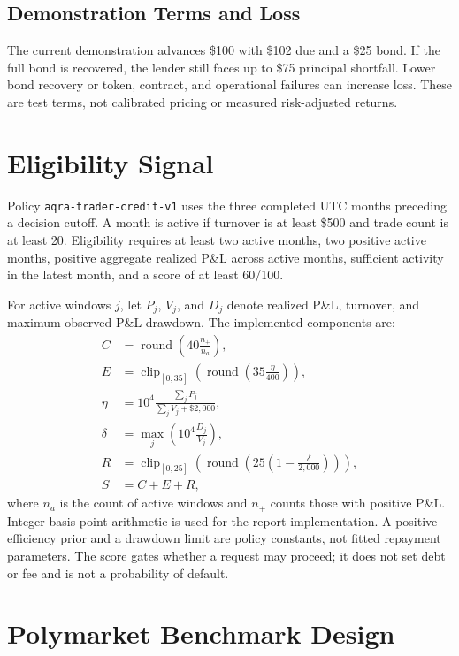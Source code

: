 \documentclass[conference]{IEEEtran}
\begin{document}
\subsection{Demonstration Terms and Loss}
The current demonstration advances \$100 with \$102 due and a \$25 bond. If the full bond is recovered, the lender still faces up to \$75 principal shortfall. Lower bond recovery or token, contract, and operational failures can increase loss. These are test terms, not calibrated pricing or measured risk-adjusted returns.

\section{Eligibility Signal}
Policy \texttt{aqra-trader-credit-v1} uses the three completed UTC months preceding a decision cutoff. A month is active if turnover is at least \$500 and trade count is at least 20. Eligibility requires at least two active months, two positive active months, positive aggregate realized P\&L across active months, sufficient activity in the latest month, and a score of at least 60/100.

For active windows \(j\), let \(P_j\), \(V_j\), and \(D_j\) denote realized P\&L, turnover, and maximum observed P\&L drawdown. The implemented components are:
\begin{align}
C &= \operatorname{round}\left(40\frac{n_+}{n_a}\right), \\
E &= \operatorname{clip}_{[0,35]}\left(\operatorname{round}\left(35\frac{\eta}{400}\right)\right),\\
\eta &= 10^4\frac{\sum_j P_j}{\sum_j V_j+\$2{,}000},\\
\delta &= \max_j \left(10^4\frac{D_j}{V_j}\right),\\
R &= \operatorname{clip}_{[0,25]}\left(\operatorname{round}\left(25\left(1-\frac{\delta}{2{,}000}\right)\right)\right),\\
S &= C+E+R,
\end{align}
where \(n_a\) is the count of active windows and \(n_+\) counts those with positive P\&L. Integer basis-point arithmetic is used for the report implementation. A positive-efficiency prior and a drawdown limit are policy constants, not fitted repayment parameters. The score gates whether a request may proceed; it does not set debt or fee and is not a probability of default.

\section{Polymarket Benchmark Design}
\end{document}
